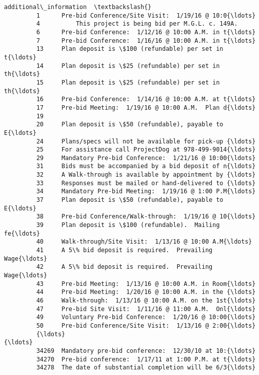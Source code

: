 \documentclass[11pt]{article}
\begin{document}
\begin{Verbatim}[commandchars=\\\{\}]
                                           additional\_information  \textbackslash{}
         1      Pre-bid Conference/Site Visit:  1/19/16 @ 10:0{\ldots}   
         4          This project is being bid per M.G.L. c. 149A.   
         6      Pre-bid Conference:  1/12/16 @ 10:00 A.M. in t{\ldots}   
         7      Pre-bid Conference:  1/16/16 @ 10:00 A.M. in t{\ldots}   
         13     Plan deposit is \$100 (refundable) per set in t{\ldots}   
         14     Plan deposit is \$25 (refundable) per set in th{\ldots}   
         15     Plan deposit is \$25 (refundable) per set in th{\ldots}   
         16     Pre-bid Conference:  1/14/16 @ 10:00 A.M. at t{\ldots}   
         17     Pre-bid Meeting:  1/19/16 @ 10:00 A.M.  Plan d{\ldots}   
         19                                                         
         20     Plan deposit is \$50 (refundable), payable to E{\ldots}   
         24     Plans/specs will not be available for pick-up {\ldots}   
         25     For assistance call ProjectDog at 978-499-9014{\ldots}   
         29     Mandatory Pre-bid Conference:  1/21/16 @ 10:00{\ldots}   
         31     Bids must be accompanied by a bid deposit of n{\ldots}   
         32     A Walk-through is available by appointment by {\ldots}   
         33     Responses must be mailed or hand-delivered to {\ldots}   
         34     Mandatory Pre-bid Meeting:  1/19/16 @ 1:00 P.M{\ldots}   
         37     Plan deposit is \$50 (refundable), payable to E{\ldots}   
         38     Pre-bid Conference/Walk-through:  1/19/16 @ 10{\ldots}   
         39     Plan deposit is \$100 (refundable).  Mailing fe{\ldots}   
         40     Walk-through/Site Visit:  1/13/16 @ 10:00 A.M{\ldots}   
         41     A 5\% bid deposit is required.  Prevailing Wage{\ldots}   
         42     A 5\% bid deposit is required.  Prevailing Wage{\ldots}   
         43     Pre-bid Meeting:  1/13/16 @ 10:00 A.M. in Room{\ldots}   
         44     Pre-bid Meeting:  1/20/16 @ 10:00 A.M. in the {\ldots}   
         46     Walk-through:  1/13/16 @ 10:00 A.M. on the 1st{\ldots}   
         47     Pre-bid Site Visit:  1/11/16 @ 11:00 A.M.  Onl{\ldots}   
         49     Voluntary Pre-bid Conference:  1/20/16 @ 10:00{\ldots}   
         50     Pre-bid Conference/Site Visit:  1/13/16 @ 2:00{\ldots}   
         {\ldots}                                                  {\ldots}   
         34269  Mandatory pre-bid conference:  12/30/10 at 10:{\ldots}   
         34270  Pre-bid conference:  1/17/11 at 1:00 P.M. at t{\ldots}   
         34278  The date of substantial completion will be 6/3{\ldots}   

\end{Verbatim}
\end{document}
